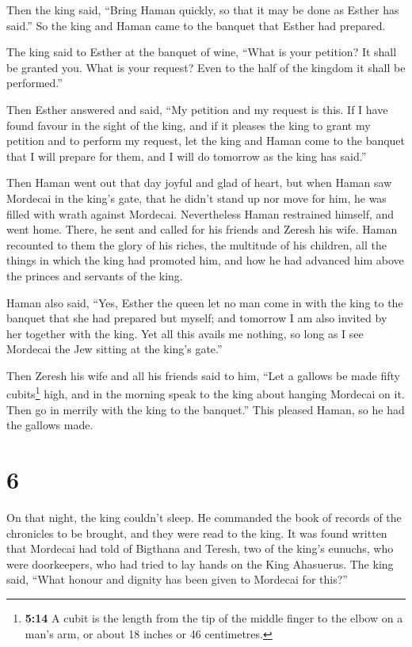  Then the king said, ``Bring Haman quickly, so that it may
be done as Esther has said.'' So the king and Haman came to the banquet
that Esther had prepared.

 The king said to Esther at the banquet of wine, ``What is
your petition? It shall be granted you. What is your request? Even to
the half of the kingdom it shall be performed.''

 Then Esther answered and said, ``My petition and my
request is this.  If I have found favour in the sight of
the king, and if it pleases the king to grant my petition and to perform
my request, let the king and Haman come to the banquet that I will
prepare for them, and I will do tomorrow as the king has said.''

 Then Haman went out that day joyful and glad of heart,
but when Haman saw Mordecai in the king's gate, that he didn't stand up
nor move for him, he was filled with wrath against Mordecai.
 Nevertheless Haman restrained himself, and went home.
There, he sent and called for his friends and Zeresh his wife.
 Haman recounted to them the glory of his riches, the
multitude of his children, all the things in which the king had promoted
him, and how he had advanced him above the princes and servants of the
king.

 Haman also said, ``Yes, Esther the queen let no man come
in with the king to the banquet that she had prepared but myself; and
tomorrow I am also invited by her together with the king.
 Yet all this avails me nothing, so long as I see
Mordecai the Jew sitting at the king's gate.''

 Then Zeresh his wife and all his friends said to him,
``Let a gallows be made fifty cubits\footnote{\textbf{5:14} A cubit is
  the length from the tip of the middle finger to the elbow on a man's
  arm, or about 18 inches or 46 centimetres.} high, and in the morning
speak to the king about hanging Mordecai on it. Then go in merrily with
the king to the banquet.'' This pleased Haman, so he had the gallows
made.

\hypertarget{section-5}{%
\section{6}\label{section-5}}

 On that night, the king couldn't sleep. He commanded the
book of records of the chronicles to be brought, and they were read to
the king.  It was found written that Mordecai had told of
Bigthana and Teresh, two of the king's eunuchs, who were doorkeepers,
who had tried to lay hands on the King Ahasuerus.  The
king said, ``What honour and dignity has been given to Mordecai for
this?''


